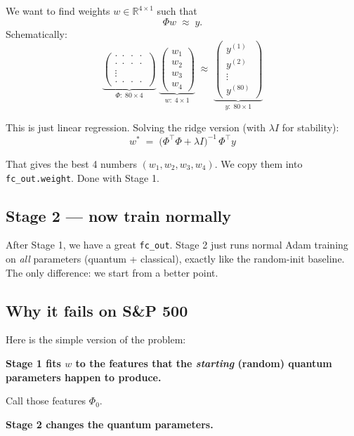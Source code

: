 \documentclass[11pt,a4paper]{article}
\begin{document}
We want to find weights $w \in \mathbb{R}^{4 \times 1}$ such that
\[
  \Phi w \;\approx\; y.
\]
Schematically:
\[
  \underbrace{\begin{pmatrix} \cdot\;\cdot\;\cdot\;\cdot \\ \cdot\;\cdot\;\cdot\;\cdot \\ \vdots \\ \cdot\;\cdot\;\cdot\;\cdot \end{pmatrix}}_{\Phi:\;80 \times 4}
  \;
  \underbrace{\begin{pmatrix} w_1 \\ w_2 \\ w_3 \\ w_4 \end{pmatrix}}_{w:\;4 \times 1}
  \;\approx\;
  \underbrace{\begin{pmatrix} y^{(1)} \\ y^{(2)} \\ \vdots \\ y^{(80)} \end{pmatrix}}_{y:\;80 \times 1}
\]

This is just linear regression. Solving the ridge version (with $\lambda I$ for stability):
\[
  \boxed{\;w^* \;=\; \bigl(\Phi^\top \Phi + \lambda I\bigr)^{-1}\,\Phi^\top y\;}
\]

That gives the best 4 numbers $(w_1, w_2, w_3, w_4)$. We copy them into \texttt{fc\_out.weight}. Done with Stage 1.

\subsection{Stage 2 --- now train normally}

After Stage 1, we have a great \texttt{fc\_out}. Stage 2 just runs normal Adam training on \emph{all} parameters (quantum + classical), exactly like the random-init baseline. The only difference: we start from a better point.

\subsection{Why it fails on S\&P 500}

Here is the simple version of the problem:

\textbf{Stage 1 fits $w$ to the features that the \emph{starting} (random) quantum parameters happen to produce.}

Call those features $\Phi_0$.

\textbf{Stage 2 changes the quantum parameters.}
\end{document}
